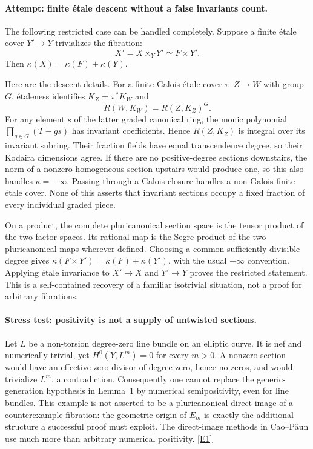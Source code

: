 \documentclass[11pt,a4paper]{article}
\newcommand{\eref}[2]{\hyperlink{extra:#1:#2}{[E#2]}}
\numberwithin{equation}{section}
\begin{document}
\paragraph{Attempt: finite \'etale descent without a false invariants count.}
The following restricted case can be handled completely. Suppose a finite
\'etale cover $Y'\to Y$ trivializes the fibration:
\[
 X'=X\times_Y Y'\simeq F\times Y'.
\]
Then $\kappa(X)=\kappa(F)+\kappa(Y)$.

Here are the descent details. For a finite Galois \'etale cover
$\pi:Z\to W$ with group $G$, \'etaleness identifies $K_Z=\pi^*K_W$ and
\[
 R(W,K_W)=R(Z,K_Z)^G.
\]
For any element $s$ of the latter graded canonical ring, the monic
polynomial $\prod_{g\in G}(T-gs)$ has invariant coefficients. Hence
$R(Z,K_Z)$ is integral over its invariant subring. Their fraction fields
have equal transcendence degree, so their Kodaira dimensions agree.
If there are no positive-degree sections downstairs, the norm of a
nonzero homogeneous section upstairs would produce one, so this also
handles $\kappa=-\infty$. Passing through a Galois closure handles a
non-Galois finite \'etale cover. None of this asserts that invariant
sections occupy a fixed fraction of every individual graded piece.

On a product, the complete pluricanonical section space is the tensor
product of the two factor spaces. Its rational map is the Segre product
of the two pluricanonical maps wherever defined. Choosing a common
sufficiently divisible degree gives
$\kappa(F\times Y')=\kappa(F)+\kappa(Y')$, with the usual $-\infty$
convention. Applying \'etale invariance to $X'\to X$ and $Y'\to Y$ proves
the restricted statement. This is a self-contained recovery of a familiar
isotrivial situation, not a proof for arbitrary fibrations.

\paragraph{Stress test: positivity is not a supply of untwisted sections.}
Let $L$ be a non-torsion degree-zero line bundle on an elliptic curve.
It is nef and numerically trivial, yet $H^0(Y,L^m)=0$ for every $m>0$.
A nonzero section would have an effective zero divisor of degree zero,
hence no zeros, and would trivialize $L^m$, a contradiction. Consequently
one cannot replace the generic-generation hypothesis in Lemma~1 by
numerical semipositivity, even for line bundles. This example is not
asserted to be a pluricanonical direct image of a counterexample fibration:
the geometric origin of $E_m$ is exactly the additional structure a
successful proof must exploit. The direct-image methods in
Cao--P\u{a}un use much more than arbitrary numerical positivity.
\eref{statement}{1}
\end{document}
